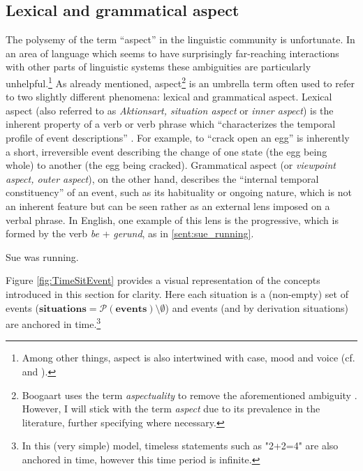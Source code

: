 \subsection{Lexical and grammatical aspect}
The polysemy of the term “aspect” in the linguistic community is unfortunate. In an area of language which seems to have surprisingly far-reaching interactions with other parts of linguistic systems these ambiguities are particularly unhelpful.\footnote{Among other things, aspect is also intertwined with case, mood and voice (cf. \citet{franks2005slavic} and \citet{Kiparsky2004PartitiveCA}).}
As already mentioned, aspect\footnote{Boogaart uses the term \emph{aspectuality} to remove the aforementioned ambiguity \citep{Boogaart+2004+1165+1180}. However, I will stick with the term \emph{aspect} due to its prevalence in the literature, further specifying where necessary.} is an umbrella term often used to refer to two slightly different phenomena: lexical and grammatical aspect. Lexical aspect (also referred to as \emph{Aktionsart, situation aspect} or \emph{inner aspect}) is the inherent property of a verb or verb phrase which “characterizes the temporal profile of event descriptions” \citep{10.1093/oxfordhb/9780199601264.013.25}. For example, to “crack open an egg” is inherently a short, irreversible event describing the change of one state (the egg being whole) to another (the egg being cracked). Grammatical aspect (or \emph{viewpoint aspect, outer aspect}), on the other hand, describes the “internal temporal constituency” \citep{comrie1976aspect} of an event, such as its habituality or ongoing nature, which is not an inherent feature but can be seen rather as an external lens imposed on a verbal phrase. In English, one example of this lens is the progressive, which is formed by the verb \emph{be} + \emph{gerund}, as in \ref{sent:sue_running}.

\begin{exe}
    \ex Sue was running.
    \label{sent:sue_running}
\end{exe}
Figure \ref{fig:TimeSitEvent} provides a visual representation of the concepts introduced in this section for clarity. Here each situation is a (non-empty) set of events ($\mathbf{situations} = \mathcal{P}(\mathbf{events}) \setminus \emptyset$) and events (and by derivation situations) are anchored in time.\footnote{In this (very simple) model, timeless statements such as "2+2=4" are also anchored in time, however this time period is infinite.}

